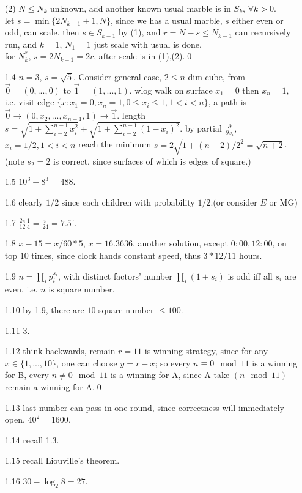 \documentclass[paper=a4, fontsize=11pt]{scrartcl} %
\numberwithin{equation}{section} %
\numberwithin{figure}{section} %
\numberwithin{table}{section} %
\begin{document}
\begin{itemize}
	(2) $N\leq N_k$ unknown, add another known usual marble is in $S_k$, $\forall k>0$.\\
	let $s= \min\{2N_{k-1}+1, N\}$, since we has a usual marble, $s$ either even or odd, can scale. then $s\in S_{k-1}$ by (1), and $r=N-s\leq N_{k-1}$ can recursively run, and $k=1$, $N_1=1$ just scale with usual is done.\\
	for $N_k^*$, $s=2N_{k-1}=2r$, after scale is in (1),(2).\qed
	\item[1.4] $n=3$, $s=\sqrt{5}$. Consider general case, $2\leq n$-dim cube, from $\overrightarrow{0}=(0,...,0)$ to $\overrightarrow{1}=(1,...,1)$. wlog walk on surface $x_1=0$ then $x_n=1$, i.e. visit edge $\{x:x_1=0,x_n=1, 0\leq x_i\leq 1, 1<i<n\}$, a path is $\overrightarrow{0} \rightarrow (0,x_2,...,x_{n-1},1) \rightarrow \overrightarrow{1}$. length $s=\sqrt{1+ \sum_{i=2}^{n-1}x_i^2}+\sqrt{1+ \sum_{i=2}^{n-1}(1-x_i)^2}$. by partial $\frac{\partial}{\partial x_i}$, $x_i=1/2,1<i<n$ reach the minimum $s=2\sqrt{1+ (n-2)/2^2}=\sqrt{n+2}$. (note $s_2=2$ is correct, since surfaces of which is edges of square.)
	\item[1.5] $10^3-8^3=488$.
	\item[1.6] clearly $1/2$ since each children with probability $1/2$.(or consider $E$ or MG) 
	\item[1.7] $\frac{2\pi}{12}\frac{1}{4}=\frac{\pi}{24}=7.5^\circ$.
	\item[1.8] $x-15 = x/60 *5$, $x=16.3636$. another solution, except $0:00,12:00$, on top $10$ times, since clock hands constant speed, thus $3*12/11$ hours.
	\item[1.9] $n = \prod_i p_i^{s_i}$, with distinct factors' number $\prod_i (1+s_i)$ is odd iff all $s_i$ are even, i.e. $n$ is square number. 
	\item[1.10] by 1.9, there are $10$ square number $\leq 100$.
	\item[1.11] $3$.
	\item[1.12] think backwards, remain $r=11$ is winning strategy, since for any $x\in\{1,...,10\}$, one can choose $y=r-x$; so every $n\equiv 0 \mod 11$ is a winning for B, every $n\neq 0 \mod 11$ is a winning for A, since A take $(n \mod 11)$ remain a winning for A.\qed
	\item[1.13] last number can pass in one round, since correctness will immediately open. $40^2=1600$.
	\item[1.14] recall 1.3.
	\item[1.15] recall Liouville's theorem.
	\item[1.16] $30-\log_2 8=27$.

\end{itemize}
\end{document}
